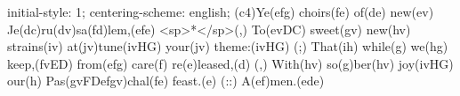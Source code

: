 initial-style: 1;
centering-scheme: english;
(c4)Ye(efg) choirs(fe) of(de) new(ev) Je(dc)ru(dv)sa(fd)lem,(efe) <sp>*</sp>(,)
To(evDC) sweet(gv) new(hv) strains(iv) at(jv)tune(ivHG) your(jv) theme:(ivHG) (;)
That(ih) while(g) we(hg) keep,(fvED) from(efg) care(f) re(e)leased,(d) (,)
With(hv) so(g)ber(hv) joy(ivHG) our(h) Pas(gvFDefgv)chal(fe) feast.(e) (::)
A(ef)men.(ede)

